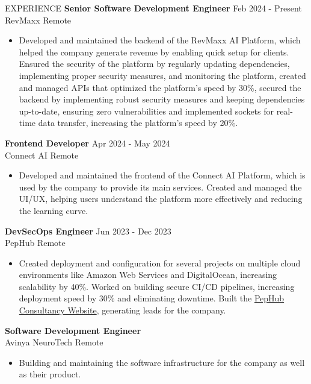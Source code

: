 \documentclass{resume}
\begin{document}
\vspace{-0.4em}
\begin{rSection}{EXPERIENCE}
  {\bf Senior Software Development Engineer} \hfill {Feb 2024 - Present}\\
  RevMaxx \hfill {Remote}
  \vspace{-0.4em}
  \begin{itemize}
    \item{Developed and maintained the backend of the RevMaxx AI Platform, which helped the company generate revenue by enabling quick setup for clients. Ensured the security of the platform by regularly updating dependencies, implementing proper security measures, and monitoring the platform, created and managed APIs that optimized the platform's speed by 30\%, secured the backend by implementing robust security measures and keeping dependencies up-to-date, ensuring zero vulnerabilities and implemented sockets for real-time data transfer, increasing the platform's speed by 20\%.}
  \end{itemize}
  \vspace{-0.4em}
  {\bf Frontend Developer} \hfill {Apr 2024 - May 2024}\\
  Connect AI \hfill {Remote}
  \vspace{-0.4em}
  \begin{itemize}
    \item{Developed and maintained the frontend of the Connect AI Platform, which is used by the company to provide its main services. Created and managed the UI/UX, helping users understand the platform more effectively and reducing the learning curve.}
  \end{itemize}
  \vspace{-0.4em}
  {\bf DevSecOps Engineer} \hfill {Jun 2023 - Dec 2023}\\
  PepHub \hfill {Remote}
  \vspace{-0.4em}
  \begin{itemize}
    \item{Created deployment and configuration for several projects on multiple cloud environments like Amazon Web Services and DigitalOcean, increasing scalability by 40\%. Worked on building secure CI/CD pipelines, increasing deployment speed by 30\% and eliminating downtime. Built the {\href{https://consultancy.pephub.tech}{PepHub Consultancy Website}}, generating leads for the company.}
  \end{itemize}
  \vspace{-0.4em}
  {\bf Software Development Engineer} \hfill \\
  Avinya NeuroTech \hfill {Remote}
  \vspace{-0.4em}
  \begin{itemize}
    \item{Building and maintaining the software infrastructure for the company as well as their product.}
  \end{itemize}
\end{rSection}
\end{document}
